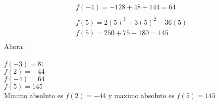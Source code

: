 \documentclass{report}
\begin{document}
{\begin{align*}
     & f(-4) = -128 + 48 +144  = 64                                                    \\\\
     & f(5) = 2(5)^3 +3(5)^2 -36(5)                                           \\
     & f(5) = 250  + 75 - 180 = 145                                                  \\
\end{align*}
Ahora :\\\\
$  f(-3) = 81 $\\
$  f(2) = - 44$\\
$  f(-4) = 64$\\
$  f(5) = 145 $\\
Minimo absoluto es $ f(2) = -44 $ y maximo absoluto es $ f(5) = 145 $
}
\end{document}
